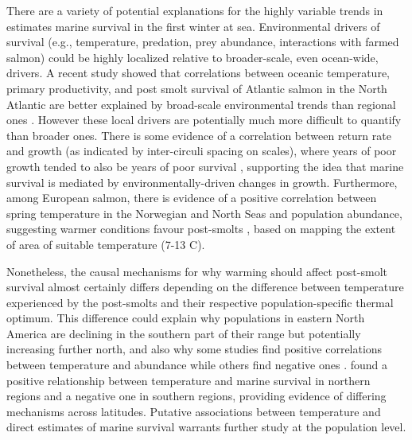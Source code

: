\documentclass[12pt]{article}
\begin{document}
There are a variety of potential explanations for the highly variable trends
in estimates marine survival in the first winter at sea.
Environmental drivers of survival (e.g., temperature, predation, prey abundance, 
interactions with farmed salmon) could be highly localized 
relative to broader-scale, even ocean-wide, drivers.
A recent study showed that correlations between oceanic temperature, primary
productivity, and post smolt survival of Atlantic salmon in the North Atlantic
are better explained by broad-scale environmental trends than regional ones
\citep{Olmos2020}.
However these local drivers are potentially much more difficult to quantify than 
broader ones.
There is some evidence of a correlation between return rate and growth (as
indicated by inter-circuli spacing on scales), where years of poor growth
tended to also be years of poor survival \citep{Friedland1993}, supporting the
idea that marine survival is mediated by environmentally-driven changes in growth.
Furthermore, among European salmon, there is evidence of a positive correlation
between spring temperature in the Norwegian and North Seas and population abundance, 
suggesting warmer
conditions favour post-smolts \citep{Friedland1998}, based on mapping the
extent of area of suitable temperature (7-13 \textdegree C).

Nonetheless, the causal mechanisms for why warming should affect post-smolt
survival almost certainly differs depending on the difference between
temperature experienced by the post-smolts and their respective
population-specific thermal optimum. 
This difference could explain why populations in eastern North America are
declining in the southern part of their range but potentially increasing
further north, and also why some studies find positive correlations between
temperature and abundance \citep{Friedland1998, Friedland1998b, Jonsson2004}
while others find negative ones \citep{Friedland1993, Todd2008}.
\citet{Olmos2020} found a positive relationship between temperature and marine survival 
in northern regions and a negative one in southern regions, providing 
evidence of differing mechanisms across latitudes.
Putative associations between temperature and direct estimates of marine
survival warrants further study at the population level.
\end{document}
